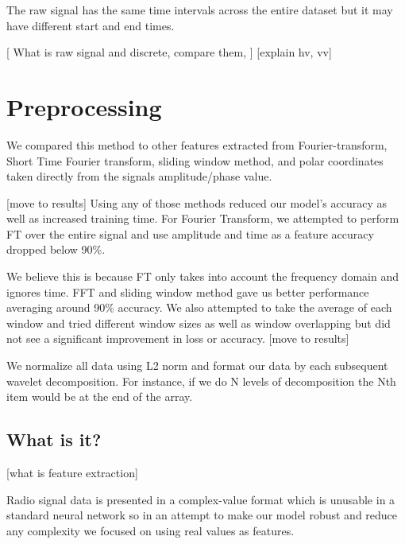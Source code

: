 \documentclass{turabian-thesis}
\begin{document}
The raw signal has the same time intervals across the entire dataset but it may have different start and end times. 


[ What is raw signal and discrete, compare them, ]
[explain hv, vv]
\chapter{Preprocessing}
We compared this method to other features extracted from Fourier-transform, Short Time Fourier transform, sliding window method, and polar coordinates taken directly from the signals amplitude/phase value. 


[move to results]
Using any of those methods reduced our model's accuracy as well as increased training time. For Fourier Transform, we attempted to perform FT over the entire signal and use amplitude and time as a feature accuracy dropped below 90\%. 


We believe this is because FT only takes into account the frequency domain and ignores time. FFT and sliding window method gave us better performance averaging around 90\% accuracy. We also attempted to take the average of each window and tried different window sizes as well as window overlapping but did not see a significant improvement in loss or accuracy.
[move to results]

We normalize all data using L2 norm and format our data by each subsequent wavelet decomposition. For instance, if we do N levels of decomposition the Nth item would be at the end of the array.

\section{What is it?}
[what is feature extraction]


Radio signal data is presented in a complex-value format which is unusable in a standard neural network so in an attempt to make our model robust and reduce any complexity we focused on using real values as features.


\end{document}
